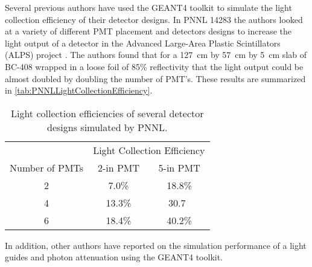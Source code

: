 Several previous authors have used the GEANT4 toolkit to simulate the light collection efficiency of their detector designs.
In PNNL 14283 the authors looked at a variety of different PMT placement and detectors designs to increase the light output of a detector in the Advanced Large-Area Plastic Scintillators (ALPS) project \cite{pnnl_14283}.
The authors found that for a \SI{127}{\cm} by \SI{57}{\cm} by \SI{5}{\cm} slab of BC-408 wrapped in a loose foil of 85\% reflectivity that the light output could be almost doubled by doubling the number of PMT's.
These results are summarized in \autoref{tab:PNNLLightCollectionEfficiency}.
\begin{table}
  \centering
  \caption[PNNL Light Collection Efficiencies]{Light collection efficiencies of several detector designs simulated by PNNL\cite{pnnl_14283}.}
  \label{tab:PNNLLightCollectionEfficiency}
  \begin{tabular}{c|c c}
  \toprule
  & \multicolumn{2}{c}{Light Collection Efficiency} \\
  Number of PMTs  & 2-in PMT & 5-in PMT \\
  \midrule
  2 & 7.0\% & 18.8\% \\
  4 & 13.3\% & 30.7\ \\
  6 & 18.4\% & 40.2\% \\
  \bottomrule
  \end{tabular}
\end{table}
In addition, other authors have reported on the simulation performance of a light guides and photon attenuation using the GEANT4 toolkit.

